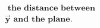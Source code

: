 \documentclass[preview]{standalone}
\begin{document}
\begin{align*}
\,\, \textbf{the distance between} \\ \mathbf{\vec{y}} \,\, \textbf{and the plane.}
\end{align*}
\end{document}
